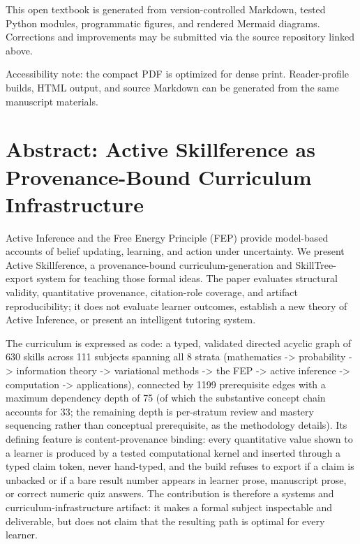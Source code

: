 \documentclass[
  english,
]{article}
\begin{document}
\vspace{1.0em}
\noindent This open textbook is generated from version-controlled Markdown, tested Python modules, programmatic figures, and rendered Mermaid diagrams. Corrections and improvements may be submitted via the source repository linked above.

\vfill
\noindent Accessibility note: the compact PDF is optimized for dense print. Reader-profile builds, HTML output, and source Markdown can be generated from the same manuscript materials.
\clearpage
\tableofcontents
\clearpage

\section{Abstract: Active Skillference as Provenance-Bound Curriculum
Infrastructure}\label{abstract-active-skillference-as-provenance-bound-curriculum-infrastructure}

Active Inference and the Free Energy Principle (FEP) provide model-based
accounts of belief updating, learning, and action under uncertainty. We
present Active Skillference, a provenance-bound curriculum-generation
and SkillTree-export system for teaching those formal ideas. The paper
evaluates structural validity, quantitative provenance, citation-role
coverage, and artifact reproducibility; it does not evaluate learner
outcomes, establish a new theory of Active Inference, or present an
intelligent tutoring system.

The curriculum is expressed as code: a typed, validated directed acyclic
graph of 630 skills across 111 subjects spanning all 8 strata
(mathematics -\textgreater{} probability -\textgreater{} information
theory -\textgreater{} variational methods -\textgreater{} the FEP
-\textgreater{} active inference -\textgreater{} computation
-\textgreater{} applications), connected by 1199 prerequisite edges with
a maximum dependency depth of 75 (of which the substantive concept chain
accounts for 33; the remaining depth is per-stratum review and mastery
sequencing rather than conceptual prerequisite, as the methodology
details). Its defining feature is content-provenance binding: every
quantitative value shown to a learner is produced by a tested
computational kernel and inserted through a typed claim token, never
hand-typed, and the build refuses to export if a claim is unbacked or if
a bare result number appears in learner prose, manuscript prose, or
correct numeric quiz answers. The contribution is therefore a systems
and curriculum-infrastructure artifact: it makes a formal subject
inspectable and deliverable, but does not claim that the resulting path
is optimal for every learner.
\end{document}
